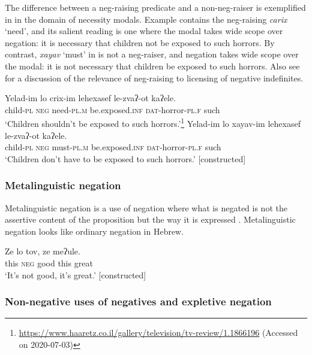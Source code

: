 \documentclass[output=paper,colorlinks,citecolor=brown]{langscibook}
\begin{document}
The difference between a neg-raising predicate and a non-neg-raiser is exemplified in  in the domain of necessity modals. Example  contains the neg-raising \textit{carix} ‘need', and its salient reading is one where the modal takes wide scope over negation: it is necessary that children not be exposed to such horrors. By contrast, \textit{xayav} ‘must' in  is not a neg-raiser, and negation takes wide scope over the modal: it is not necessary that children be exposed to such horrors. Also see  for a discussion of the relevance of neg-raising to licensing of negative indefinites.

\ea\label{ex:heb:46}
    \ea\label{ex:heb:46a}
        \gll Yelad-im lo crix-im lehexasef le-zvaʔ-ot kaʔele.\\
            child-\textsc{pl} \textsc{neg} need{}-\textsc{pl.m} be.exposed.\textsc{inf} \textsc{dat-}horror-\textsc{pl.f} such\\
        \glt ‘Children shouldn’t be exposed to such horrors.’\footnote{\url{https://www.haaretz.co.il/gallery/television/tv-review/1.1866196} (Accessed on 2020-07-03)}
    \ex\label{ex:heb:46b}
        \gll Yelad-im lo xayav-im lehexasef le-zvaʔ{}-ot kaʔele.\\
            child-\textsc{pl} \textsc{neg} must{}-\textsc{pl.m} be.exposed.\textsc{inf} \textsc{dat-}horror-\textsc{pl.f} such\\
        \glt ‘Children don’t have to be exposed to such horrors.’ [constructed]
    \z 
\z

\subsubsection{Metalinguistic negation} \label{sec:heb:4.6.2}

Metalinguistic negation is a use of negation where what is negated is not the assertive content of the proposition but the way it is expressed \citep[363]{Horn1989}. Metalinguistic negation looks like ordinary negation in Hebrew.

\ea\label{ex:heb:47}
    \gll Ze lo tov, ze meʔule.\\
        this \textsc{neg} good this great\\
    \glt ‘It’s not good, it’s great.’ [constructed]
\z 

\subsubsection{Non-negative uses of negatives and expletive negation} \label{sec:heb:4.6.3}
\end{document}
